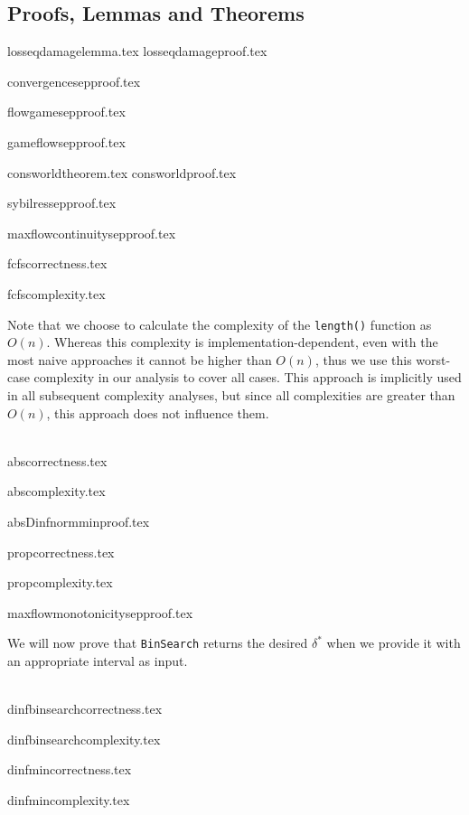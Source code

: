 \subsection{Proofs, Lemmas and Theorems}
{losseqdamagelemma.tex}
{losseqdamageproof.tex}

{convergencesepproof.tex}

{flowgamesepproof.tex}

{gameflowsepproof.tex}

{consworldtheorem.tex}
{consworldproof.tex}

{sybilressepproof.tex}

{maxflowcontinuitysepproof.tex}

{fcfscorrectness.tex}

{fcfscomplexity.tex}

Note that we choose to calculate the complexity of the \texttt{length()} function as $O\left(n\right)$. Whereas this
complexity is implementation-dependent, even with the most naive approaches it cannot be higher than $O\left(n\right)$,
thus we use this worst-case complexity in our analysis to cover all cases. This approach is implicitly used in all
subsequent complexity analyses, but since all complexities are greater than $O\left(n\right)$, this approach does not
influence them.

\ \\

{abscorrectness.tex}

{abscomplexity.tex}

{absDinfnormminproof.tex}

{propcorrectness.tex}

{propcomplexity.tex}

{maxflowmonotonicitysepproof.tex}

We will now prove that \texttt{BinSearch} returns the desired $\delta^*$ when we provide it with an appropriate interval as
input.

\ \\

{dinfbinsearchcorrectness.tex}

{dinfbinsearchcomplexity.tex}

{dinfmincorrectness.tex}

{dinfmincomplexity.tex}
